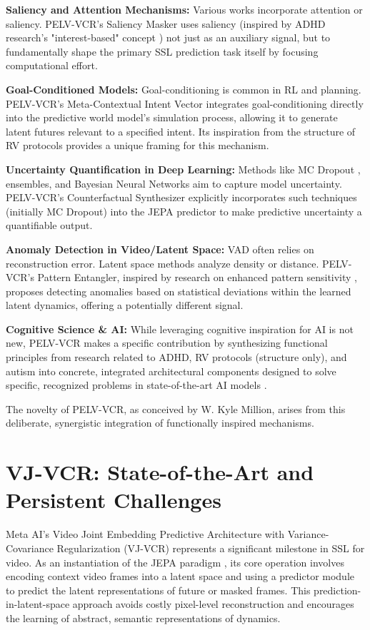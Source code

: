 \documentclass[11pt]{article}
\begin{document}
\textbf{Saliency and Attention Mechanisms:} Various works incorporate attention or saliency. PELV-VCR's Saliency Masker uses saliency (inspired by ADHD research's "interest-based" concept \cite{DodsonVarious}) not just as an auxiliary signal, but to fundamentally shape the primary SSL prediction task itself by focusing computational effort.

\textbf{Goal-Conditioned Models:} Goal-conditioning is common in RL and planning. PELV-VCR's Meta-Contextual Intent Vector integrates goal-conditioning directly into the predictive world model's simulation process, allowing it to generate latent futures relevant to a specified intent. Its inspiration from the structure of RV protocols \cite{Puthoff1996} provides a unique framing for this mechanism.

\textbf{Uncertainty Quantification in Deep Learning:} Methods like MC Dropout \cite{Gal2016}, ensembles, and Bayesian Neural Networks aim to capture model uncertainty. PELV-VCR's Counterfactual Synthesizer explicitly incorporates such techniques (initially MC Dropout) into the JEPA predictor to make predictive uncertainty a quantifiable output.

\textbf{Anomaly Detection in Video/Latent Space:} VAD often relies on reconstruction error. Latent space methods analyze density or distance. PELV-VCR's Pattern Entangler, inspired by research on enhanced pattern sensitivity \cite{Mottron2006, BaronCohen2009}, proposes detecting anomalies based on statistical deviations within the learned latent dynamics, offering a potentially different signal.

\textbf{Cognitive Science & AI:} While leveraging cognitive inspiration for AI is not new, PELV-VCR makes a specific contribution by synthesizing functional principles from research related to ADHD, RV protocols (structure only), and autism into concrete, integrated architectural components designed to solve specific, recognized problems in state-of-the-art AI models \cite{NRC1995, Samson2011, Zhu2023, Bardes2022}.

The novelty of PELV-VCR, as conceived by W. Kyle Million, arises from this deliberate, synergistic integration of functionally inspired mechanisms.

\section{VJ-VCR: State-of-the-Art and Persistent Challenges}
\label{sec:challenges}
Meta AI's Video Joint Embedding Predictive Architecture with Variance-Covariance Regularization (VJ-VCR) \cite{Bardes2024} represents a significant milestone in SSL for video. As an instantiation of the JEPA paradigm \cite{LeCun2022}, its core operation involves encoding context video frames into a latent space and using a predictor module to predict the latent representations of future or masked frames. This prediction-in-latent-space approach avoids costly pixel-level reconstruction and encourages the learning of abstract, semantic representations of dynamics.
\end{document}
